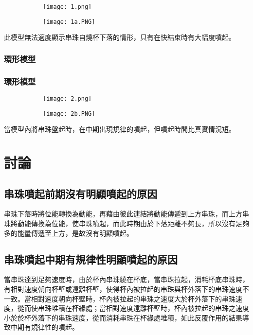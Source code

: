 \documentclass[11pt,twoside,b5paper]{article}
\begin{document}
\begin{figure}[H]
    \centering
    \begin{subfigure}[t]{0.3\linewidth}
    \texttt{[image: 1.png]}
    \end{subfigure}
    \begin{subfigure}[t]{0.65\linewidth}
    \texttt{[image: 1a.PNG]}
    \end{subfigure}
\end{figure}

此模型無法適度顯示串珠自燒杯下落的情形，只有在快結束時有大幅度噴起。

\subsubsection{環形模型}
\subsubsection{環形模型}

\begin{figure}[H]
    \centering
    \begin{subfigure}[t]{0.3\linewidth}
    \texttt{[image: 2.png]}
    \end{subfigure}
    \begin{subfigure}[t]{0.65\linewidth}
    \texttt{[image: 2b.PNG]}
    \end{subfigure}
\end{figure}

當模型內將串珠盤起時，在中期出現規律的噴起，但噴起時間比真實情況短。

\section{討論}

\subsection{串珠噴起前期沒有明顯噴起的原因}
串珠下落時將位能轉換為動能，再藉由彼此連結將動能傳遞到上方串珠，而上方串珠將動能傳換為位能，使串珠噴起，而此時期由於下落距離不夠長，所以沒有足夠多的能量傳遞至上方，是故沒有明顯噴起。

\subsection{串珠噴起中期有規律性明顯噴起的原因}
當串珠達到足夠速度時，由於杯內串珠繞在杯底，當串珠拉起，消耗杯底串珠時，有相對速度朝向杯壁或遠離杯壁，使得杯內被拉起的串珠與杯外落下的串珠速度不一致。當相對速度朝向杯壁時，杯內被拉起的串珠之速度大於杯外落下的串珠速度，從而使串珠堆積在杯緣處；當相對速度遠離杯壁時，杯內被拉起的串珠之速度小於於杯外落下的串珠速度，從而消耗串珠在杯緣處堆積，如此反覆作用的結果導致中期有規律性的噴起。
\end{document}
